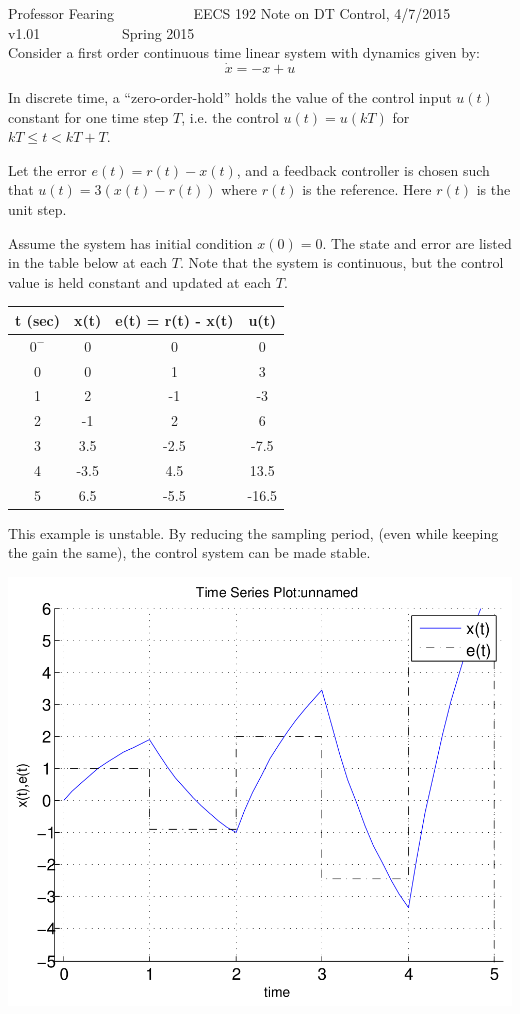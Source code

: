 \documentclass[11pt]{article}
\begin{document}
\thispagestyle{empty}
Professor Fearing ~~~~~~~~~~ EECS 192 Note on DT Control, 4/7/2015 v1.01~~~~~~~~~~~ Spring 2015\\



Consider a first order continuous time linear system with dynamics given by:
\begin{equation}
\dot{x} = -x + u
\end{equation}

In discrete time, a ``zero-order-hold'' holds the 
value of the control input $u(t)$ constant for one time step $T$, i.e.
the control $u(t) = u(kT)$ for $kT \le t < kT+T$.

Let the error $e(t) = r(t) - x(t)$, and a feedback controller
is chosen such that $u(t) = 3(x(t) - r(t))$ where $r(t)$ is the reference.
Here $r(t)$ is the unit step.

Assume the system has initial condition $x(0) = 0$. The state and error are listed
in the table below at each $T$. Note that the system is continuous,
but the control value is held constant and updated at each $T$.\\

\begin{tabular}{cccc}
t (sec) & x(t) & e(t) = r(t) - x(t) & u(t) \\
\hline
\hline
$0^-$ & 0 & 0 & 0 \\
0 & 0 & 1 & 3\\
1 & 2 & -1 & -3\\
2 & -1 & 2 & 6\\
3 & 3.5 & -2.5 & -7.5\\
4 & -3.5 & 4.5 & 13.5\\
5 & 6.5 & -5.5 & -16.5
\end{tabular}

This example is unstable. By reducing the sampling period, 
(even while keeping the gain the same), the control system can be made stable.

\includegraphics[scale=0.5]{dt-unstable.png}
\end{document}
